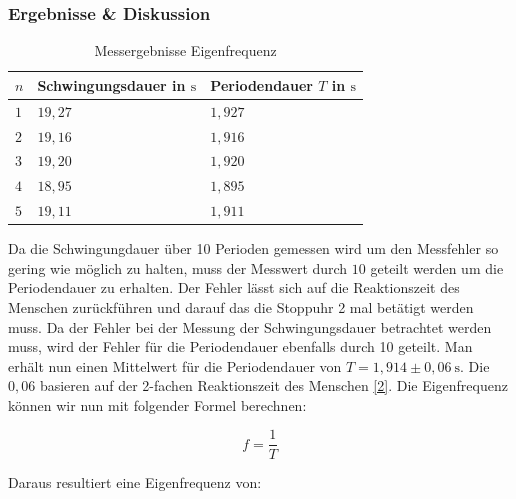         \subsubsection{Ergebnisse \& Diskussion}

            \begin{table}[H]
                \centering
                \caption{Messergebnisse Eigenfrequenz}
                \vspace{0.5em}
                \begin{tabular}{|l|l|l|}
                    \hline
                    $n$ & Schwingungsdauer in $\mathrm{s}$ & Periodendauer $T$ in $\mathrm{s}$\\
                    \hline
                    \hline
                    $1$ & $19,27$ & $1,927$ \\
                    \hline
                    $2$ & $19,16$ & $1,916$ \\
                    \hline
                    $3$ & $19,20$ & $1,920$ \\
                    \hline
                    $4$ & $18,95$ & $1,895$ \\
                    \hline
                    $5$ & $19,11$ & $1,911$ \\
                    \hline
                \end{tabular}
                \label{tab:Eigenfrequenz}
            \end{table}

            Da die Schwingungdauer über 10 Perioden gemessen wird um den Messfehler so gering wie möglich zu halten, muss der Messwert durch $10$ geteilt werden um die Periodendauer zu erhalten. Der Fehler lässt sich auf die Reaktionszeit des Menschen zurückführen und darauf das die Stoppuhr 2 mal betätigt werden muss. Da der Fehler bei der Messung der Schwingungsdauer betrachtet werden muss, wird der Fehler für die Periodendauer ebenfalls durch 10 geteilt.
            Man erhält nun einen Mittelwert für die Periodendauer von $T = 1,914 \pm 0,06\ \mathrm{s}$. Die $0,06$ basieren auf der 2-fachen Reaktionszeit des Menschen \hyperref[ref:Versuchsaufbau]{[2]}.
            Die Eigenfrequenz können wir nun mit folgender Formel berechnen:

            \begin{equation}
                f = \frac{1}{T}
                \label{eq:Frequenz}
            \end{equation}

            Daraus resultiert eine Eigenfrequenz von:

